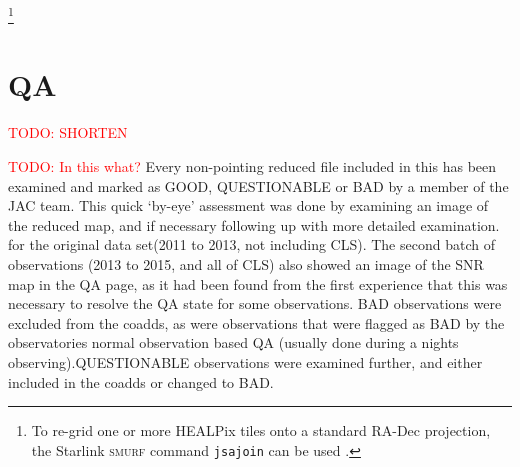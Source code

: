 \documentclass[twocolumn]{aastex6}
\newcommand{\todo}[1]{\textcolor{red}{TODO: #1}}
\newcommand{\ascl}[1]{\href{http://www.ascl.net/#1}{ascl:#1}}
\newcommand{\status}[1]{\textsf{#1}}
\begin{document}
\footnote{To re-grid one or more HEALPix tiles onto a standard RA-Dec
  projection, the Starlink \textsc{smurf} command \texttt{jsajoin} can
  be used \citep[][\ascl{1310.007}]{SUN258}.}

\section{QA}
\label{sec:QA}
\todo{SHORTEN}




\todo{In this what?}  Every non-pointing reduced file included in this
has been examined and marked as \status{GOOD}, \status{QUESTIONABLE}
or \status{BAD} by a member of the JAC team. This quick `by-eye'
assessment was done by examining an image of the reduced map, and if
necessary following up with more detailed examination. for the
original data set(2011 to 2013, not including CLS). The second batch
of observations (2013 to 2015, and all of CLS) also showed an image of
the SNR map in the QA page, as it had been found from the first
experience that this was necessary to resolve the QA state for some
observations. \status{BAD} observations were excluded from the coadds,
as were observations that were flagged as \status{BAD} by the
observatories normal observation based QA (usually done during a
nights observing).\status{QUESTIONABLE} observations were examined
further, and either included in the coadds or changed to \status{BAD}.
\end{document}
